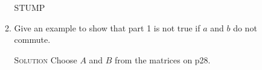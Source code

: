 \documentclass[twoside]{amsart}
\newcommand{\solution}{\textsc{Solution}\xspace}
\newcommand{\blank}{\vspace{5pt}}
\newcommand{\itm}{\blank\item}
\newcommand{\sol}{\blank\noindent\solution}
\begin{document}
\begin{enumerate}[A.]
\begin{enumerate}[1]
      STUMP

      \itm Give an example to show that part 1 is not true if $a$ and $b$
      do not commute.

      \sol Choose $A$ and $B$ from the matrices on p28.





      
   \end{enumerate}



\end{enumerate}
\end{document}
